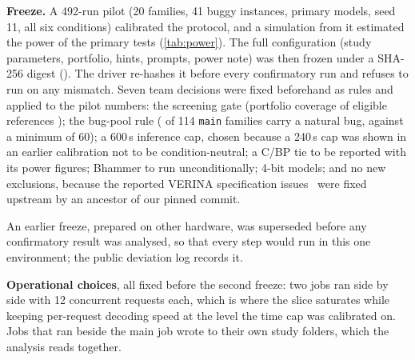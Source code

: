 \documentclass[10pt,twocolumn]{article}
\begin{document}
\textbf{Freeze.} A 492-run pilot (20 families, 41 buggy instances, primary models, seed 11, all six conditions) calibrated the
protocol, and a simulation from it estimated the power of the primary tests (\cref{tab:power}). The full
configuration (study parameters, portfolio, hints, prompts, power note) was then frozen under a SHA-256 digest
(\resFreezeDigest). The driver re-hashes it before every confirmatory run and refuses to run on any mismatch.
Seven team decisions were fixed beforehand as rules and applied to the pilot numbers: the screening gate
(portfolio coverage of eligible references \resTCoverage); the bug-pool rule (\resNaturalFamilies{} of 114
\texttt{main} families carry a natural bug, against a minimum of 60); a 600\,s inference cap, chosen because a
240\,s cap was shown in an earlier calibration not to be condition-neutral; a C/BP tie to be reported with its
power figures; Bhammer to run unconditionally; 4-bit models; and no new exclusions, because the reported VERINA
specification issues~\cite{multimodalverifier,isomorphism} were fixed upstream by an ancestor of our pinned
commit.

An earlier freeze, prepared on other hardware, was superseded before any confirmatory result was analysed, so that
every step would run in this one environment; the public deviation log records it.

\begin{table}[t]
\centering\small
\caption{Pre-freeze power of the primary tests at the 114 available \texttt{main} families (500 simulated studies,
sign-flip at $\alpha/4$), from the pilot's discordant-pair rates: point estimate and the pessimistic 80\% Jeffreys
bound, and the families needed for 80\% power at the point estimate.}
\label{tab:power}
\resPowerTable
\end{table}

\textbf{Operational choices}, all fixed before the second freeze: two jobs ran side by side with 12 concurrent
requests each, which is where the slice saturates while keeping per-request decoding speed at the level the time
cap was calibrated on. Jobs that ran beside the main job wrote to their own study folders, which the analysis
reads together.
\end{document}
